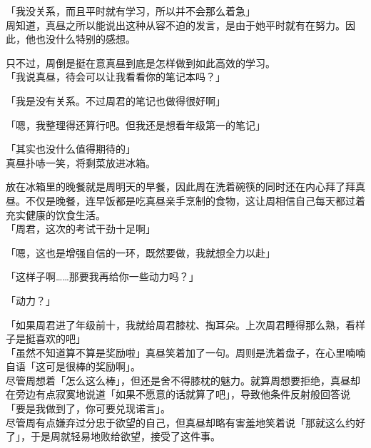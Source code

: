 「我没关系，而且平时就有学习，所以并不会那么着急」\\

周知道，真昼之所以能说出这种从容不迫的发言，是由于她平时就有在努力。因此，他也没什么特别的感想。

只不过，周倒是挺在意真昼到底是怎样做到如此高效的学习。\\

「我说真昼，待会可以让我看看你的笔记本吗？」

「我是没有关系。不过周君的笔记也做得很好啊」

「嗯，我整理得还算行吧。但我还是想看年级第一的笔记」

「其实也没什么值得期待的」\\

真昼扑哧一笑，将剩菜放进冰箱。

放在冰箱里的晚餐就是周明天的早餐，因此周在洗着碗筷的同时还在内心拜了拜真昼。不仅是晚餐，连早饭都是吃真昼亲手烹制的食物，这让周相信自己每天都过着充实健康的饮食生活。\\

「周君，这次的考试干劲十足啊」

「嗯，这也是增强自信的一环，既然要做，我就想全力以赴」

「这样子啊……那要我再给你一些动力吗？」

「动力？」

「如果周君进了年级前十，我就给周君膝枕、掏耳朵。上次周君睡得那么熟，看样子是挺喜欢的吧」\\

「虽然不知道算不算是奖励啦」真昼笑着加了一句。周则是洗着盘子，在心里喃喃自语「这可是很棒的奖励啊」。\\

尽管周想着「怎么这么棒」，但还是舍不得膝枕的魅力。就算周想要拒绝，真昼却在旁边有点寂寞地说道「如果不愿意的话就算了吧」，导致他条件反射般回答说「要是我做到了，你可要兑现诺言」。\\

尽管周有点嫌弃过分忠于欲望的自己，但真昼却略有害羞地笑着说「那就这么约好了」，于是周就轻易地败给欲望，接受了这件事。
